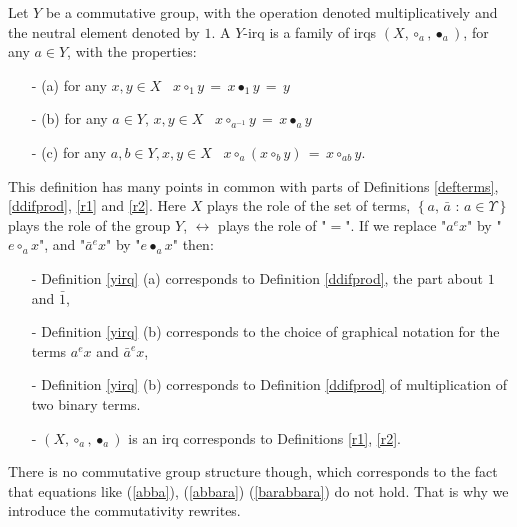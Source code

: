 \begin{definition}
Let $Y$ be a commutative group, with the operation denoted multiplicatively and the neutral element denoted by $1$. A $Y$-irq is a family of irqs $\displaystyle (X, \circ_{a}, \bullet_{a})$, for any $a \in Y$, with the properties: 
\begin{enumerate}
\item[-] (a) for any $x,y \in X$ \, $\displaystyle x \circ_{1} y \, = \, x \bullet_{1} y \, = \, y$
\item[-] (b) for any $a \in Y, \, x, y \in X$ \, $\displaystyle x \circ_{a^{-1}} y \, = \, x \bullet_{a} y$
\item[-] (c) for any $a, b \in Y, x, y \in X$ \, $x \circ_{a} ( x \circ_{b} y) \, = \, x \circ_{ab} y$.   
\end{enumerate}
\label{yirq}
\end{definition}

This definition has many points in common with parts of Definitions \ref{defterms}, \ref{ddifprod}, \ref{r1} and \ref{r2}. Here $X$ plays the role of the set of terms,  $\displaystyle \left\{ a, \, \bar{a} \mbox{ : } a \in \Upsilon\right\}$ plays the role of the group $Y$, $\displaystyle \longleftrightarrow$ plays the role of "$=$". If we replace "$\displaystyle a^{e} x$" by "$\displaystyle e \circ_{a} x$", and "$\displaystyle \bar{a}^{e} x$" by "$\displaystyle e \bullet_{a} x$" then: 
\begin{enumerate}
\item[-] Definition \ref{yirq} (a) corresponds to Definition \ref{ddifprod}, the part about $\displaystyle 1$ and $\displaystyle \bar{1}$, 
\item[-] Definition \ref{yirq} (b) corresponds to the choice of graphical notation for the terms $\displaystyle a^{e} x$ and $\displaystyle \bar{a}^{e} x$, 
\item[-] Definition \ref{yirq} (b) corresponds to Definition \ref{ddifprod} of multiplication of two binary terms.  
\item[-] $\displaystyle (X, \circ_{a}, \bullet_{a})$ is an irq corresponds to Definitions \ref{r1}, \ref{r2}.
\end{enumerate}
There is no commutative group structure though, which corresponds to the fact that equations like (\ref{abba}), (\ref{abbara}) (\ref{barabbara}) do not hold. That is why we introduce the commutativity rewrites.
